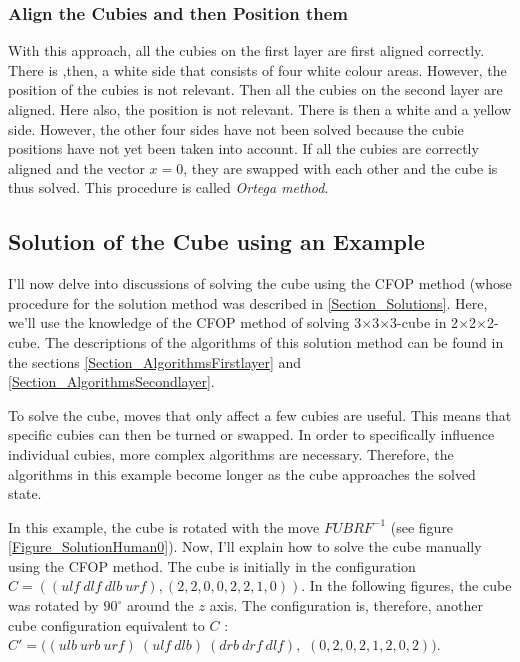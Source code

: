 \documentclass[12pt,a4paper]{article}
\theoremstyle{custom}
\newcommand{\Ttwo}{2$\times$2$\times$2-}
\newcommand{\Tthree}{3$\times$3$\times$3-}
\begin{document}
\subsubsection{Align the Cubies and then Position them}

With this approach, all the cubies on the first layer are first aligned correctly. There is ,then, a white side that consists of four white colour areas. However, the position of the cubies is not relevant. Then all the cubies on the second layer are aligned. Here also, the position is not relevant. There is then a white and a yellow side. However, the other four sides have not been solved because the cubie positions have not yet been taken into account.
If all the cubies are correctly aligned and the vector $x=0$, they are swapped with each other and the cube is thus solved. This procedure is called \textit{Ortega method}.

\subsection{Solution of the Cube using an Example}

\label{Section_SolutionExample}
I'll now delve into discussions of solving the cube using the CFOP method (whose procedure for the solution method was described in \ref{Section_Solutions}. Here, we'll use the knowledge of the CFOP method of solving \Tthree cube in \Ttwo cube.  The descriptions of the algorithms of this solution method can be found in the sections \ref{Section_AlgorithmsFirstlayer} and \ref{Section_AlgorithmsSecondlayer}.


To solve the cube, moves that only affect a few cubies are useful. This means that specific cubies can then be turned or swapped. In order to specifically influence individual cubies, more complex algorithms are necessary. Therefore, the algorithms in this example become longer as the cube approaches the solved state.


In this example, the cube is rotated with the move $\textit{FUBR}F^{-1}$ (see figure \ref{Figure_SolutionHuman0}). Now, I'll explain how to  solve the cube manually using the CFOP  method. The cube is initially in the configuration $C = ((\textit{ulf} \ \textit{dlf} \ \textit{dlb} \ \textit{urf}),(2,2,0,0,2, 2,1,0))$.
In the following figures, the cube was rotated by $90^\circ$ around the $z$ axis. The configuration is, therefore, another cube configuration equivalent to $C$ : $C'=(( \textit{ulb} \ \textit{urb} \ \textit{urf}) \ ( \textit{ulf} \ \textit{dlb} ) \ (\textit{drb} \ \textit{drf} \ \textit{dlf}),$ $(0,2,0,2,1,2,0,2))$.
\end{document}

